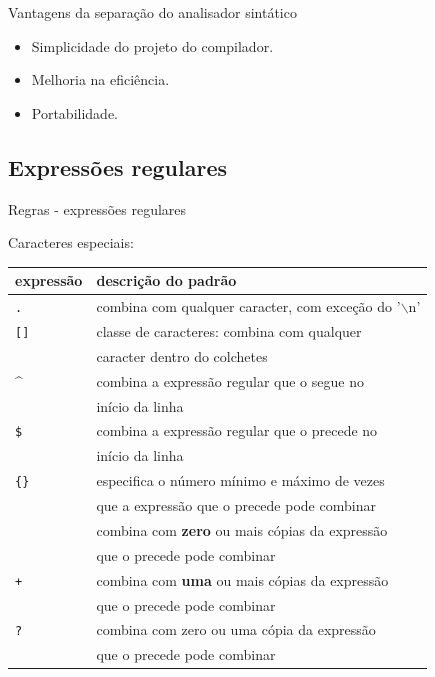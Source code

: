 \begin{frame}{Vantagens da separação do analisador sintático}

\pause

\begin{itemize}
\item Simplicidade do projeto do compilador.
\item Melhoria na eficiência.
\item Portabilidade.
\end{itemize}

\end{frame}

\subsection{Expressões regulares}
\frame{\tableofcontents[currentsubsection]}

\begin{frame}{Regras - expressões regulares}

 Caracteres especiais:\bigskip

 \footnotesize
 \center
\begin{tabular}{ll}\toprule
  \bf expressão  & \bf  descrição do padrão \\
  \midrule
  {\tt .}          &  combina com qualquer caracter, com exceção do '{$\backslash$n}'\\
  {\tt []}         &  classe de caracteres: combina com qualquer\\
                 &  caracter dentro do colchetes\\
   \^{}            &  combina a expressão regular que o segue no\\
                 &  início da linha\\
  {\tt \$}          &  combina a expressão regular que o precede no\\
                 &  início da linha\\
  {\tt \{\}}         &  especifica o número mínimo e máximo de vezes\\
                 &  que a expressão que o precede pode combinar\\
  {\tt *}          &  combina com {\bf zero} ou mais cópias da expressão\\
                 &  que o precede pode combinar\\
  {\tt +}          &  combina com {\bf uma} ou mais cópias da expressão\\
                 &  que o precede pode combinar\\
  {\tt ?}          &  combina com zero ou uma cópia da expressão\\
                 &  que o precede pode combinar\\
  \bottomrule
\end{tabular}
\end{frame}

